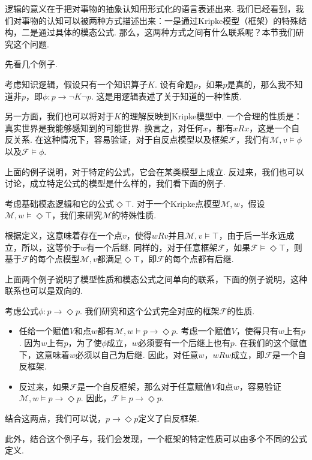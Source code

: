 逻辑的意义在于把对事物的抽象认知用形式化的语言表述出来. 我们已经看到，我们对事物的认知可以被两种方式描述出来：一是通过Kripke模型（框架）的特殊结构，二是通过具体的模态公式. 那么，这两种方式之间有什么联系呢？本节我们研究这个问题. 

先看几个例子. 
\begin{example}
考虑知识逻辑，假设只有一个知识算子$K$. 设有命题$p$，如果$p$是真的，那么我不知道非$p$，即$\phi: p \to \neg K \neg p$. 这是用逻辑表述了关于知道的一种性质. 

另一方面，我们也可以将对于$K$的理解反映到Kripke模型中. 一个合理的性质是：真实世界是我能够感知到的可能世界. 换言之，对任何$x$，都有$xRx$，这是一个自反关系. 在这种情况下，容易验证，对于自反点模型以及框架$\mathcal{F}$，我们有$\mathcal{M}, v \vDash \phi$以及$\mathcal{F} \vDash \phi$. 
\end{example}

上面的例子说明，对于特定的公式，它会在某类模型上成立. 反过来，我们也可以讨论，成立特定公式的模型是什么样的，我们看下面的例子. 

\begin{example}\label{ex:box-top}
考虑基础模态逻辑和它的公式$\Diamond \top$. 对于一个Kripke点模型$\mathcal{M},w$，假设$\mathcal{M}, w \vDash \Diamond \top$，我们来研究$\mathcal{M}$的特殊性质. 

根据定义，这意味着存在一个点$v$，使得$w R v$并且$\mathcal{M}, v \vDash \top$，由于后一半永远成立，所以，这等价于$w$有一个后继. 同样的，对于任意框架$\mathcal{F}$，如果$\mathcal{F} \vDash \Diamond \top$，则基于$\mathcal{F}$的每个点模型$\mathcal{M}, v$都满足$\Diamond \top$，即$\mathcal{F}$的每个点都有后继. 
\end{example}

上面两个例子说明了模型性质和模态公式之间单向的联系，下面的例子说明，这种联系也可以是双向的. 

\begin{example}
考虑公式$\phi:p \to \Diamond p$. 我们研究和这个公式完全对应的框架$\mathcal{F}$的性质. 
\begin{itemize}
    \item 任给一个赋值$V$和点$w$都有$\mathcal{M}, w \vDash p \to \Diamond p$. 考虑一个赋值$V$，使得只有$w$上有$p$. 因为$w$上有$p$，为了使$\phi$成立，$w$必须要有一个后继上也有$p$. 在我们的这个赋值下，这意味着$w$必须以自己为后继. 因此，对任意$w$，$wRw$成立，即$\mathcal{F}$是一个自反框架. 
    \item 反过来，如果$\mathcal{F}$是一个自反框架，那么对于任意赋值$V$和点$w$，容易验证$\mathcal{M}, w \vDash p \to \Diamond p$. 因此，$\mathcal{F} \vDash p \to \Diamond p$. 
\end{itemize}
结合这两点，我们可以说，$p\to \Diamond p$定义了自反框架. 

此外，结合这个例子与，我们会发现，一个框架的特定性质可以由多个不同的公式定义. 
\end{example}

